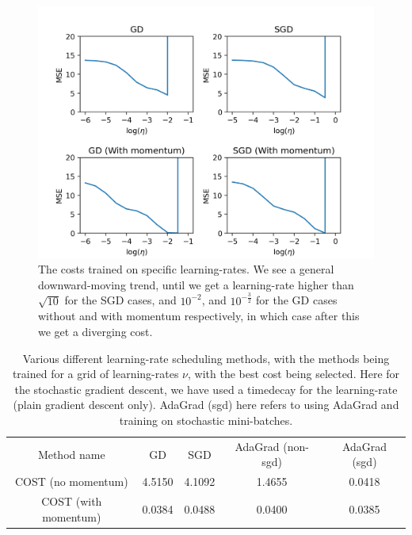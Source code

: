 \documentclass{article}
\begin{document}
\begin{figure}
      \centering
      \includegraphics[scale=0.8]{optimizers_plot}
      \caption{The costs trained on specific learning-rates. We see a general
            downward-moving trend, until we get a learning-rate higher than
            $\sqrt{10}$ for the SGD cases, and $10^{-2}$, and
            $10^{-\frac{3}{2}}$ for the GD cases without and with momentum
            respectively, in which case after this we get a diverging cost.}
      \label{learningrate-cost-plot}
\end{figure}

\begin{table}
      \centering
      \begin{tabular}{| c | c | c | c | c |}
            Method name          & GD     & SGD    & AdaGrad (non-sgd) & AdaGrad (sgd) \\
            COST (no momentum)   & 4.5150 & 4.1092 & 1.4655            & 0.0418        \\
            COST (with momentum) & 0.0384 & 0.0488 & 0.0400            & 0.0385
      \end{tabular}
      \caption{Various different learning-rate scheduling methods, with the
            methods being trained for a grid of learning-rates $\nu$, with the best
            cost being selected. Here for the stochastic gradient descent, we
            have used a timedecay for the learning-rate (plain gradient descent
            only). AdaGrad (sgd) here refers to using AdaGrad and training on
            stochastic mini-batches.}
      \label{gradmethods-comparison}
\end{table}
\end{document}
